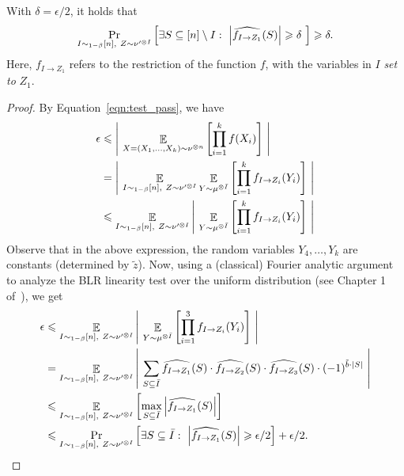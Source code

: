 \begin{lemma}\label{lemma:lfcurr}
	With $\delta = \epsilon/2$, it holds that
	\[ \Pr_{I\sim_{1-\beta}[n],\ Z\sim \nu'^{\otimes I}}\left[ \exists S\subseteq [n]\setminus I:\ \left|\widehat{f_{I\to Z_1}}(S)\right|\geqslant \delta\  \right] \geqslant \delta.\]
	Here, $f_{I\to Z_1}$ refers to the restriction of the function $f$, with the variables in $I$ \emph{set to} $Z_1$.
\end{lemma}	
\begin{proof}
	By Equation~\ref{eqn:test_pass}, we have
	\begin{align*}
		\epsilon &\leqslant \left|\ \mathop{\mathbb{E}}_{X=(X_1,\dots,X_k)\sim \nu^{\otimes n}} \left[ \prod_{i=1}^k f(X_i) \right]\ \right|
		\\&= \left|\ \mathop{\mathbb{E}}_{I\sim_{1-\beta}[n],\ Z\sim \nu'^{\otimes I}}\mathop{\mathbb{E}}_{Y\sim \mu^{\otimes \bar{I}}} \left[ \prod_{i=1}^k f_{I\to Z_i}(Y_i) \right]\ \right|
		\\&\leqslant \mathop{\mathbb{E}}_{I\sim_{1-\beta}[n],\ Z\sim \nu'^{\otimes I}}\left|\ \mathop{\mathbb{E}}_{Y\sim \mu^{\otimes \bar{I}}} \left[ \prod_{i=1}^k f_{I\to Z_i}(Y_i) \right]\ \right|		
	\end{align*}
	Observe that in the above expression, the random variables $Y_4,\dots,Y_k$ are constants (determined by $\tilde{z}$).
	Now, using a (classical) Fourier analytic argument to analyze the BLR linearity test over the uniform distribution (see Chapter 1 of~\cite{Don14}), we get
	\begin{align*}
		\epsilon &\leqslant \mathop{\mathbb{E}}_{I\sim_{1-\beta}[n],\ Z\sim \nu'^{\otimes I}}\left|\ \mathop{\mathbb{E}}_{Y\sim \mu^{\otimes \bar{I}}} \left[ \prod_{i=1}^3 f_{I\to Z_i}(Y_i) \right]\ \right|		
		\\&= \mathop{\mathbb{E}}_{I\sim_{1-\beta}[n],\ Z\sim \nu'^{\otimes I}}\left|\ \sum_{S\subseteq \bar{I}} \widehat{f_{I\to Z_1}}(S)\cdot \widehat{f_{I\to Z_2}}(S)\cdot \widehat{f_{I\to Z_3}}(S)\cdot (-1)^{\tilde{b}\cdot \left|S\right|} \ \right|
		\\&\leqslant \mathop{\mathbb{E}}_{I\sim_{1-\beta}[n],\ Z\sim \nu'^{\otimes I}} \left[ \max_{S\subseteq \bar{I}}\left|\widehat{f_{I\to Z_1}}(S)\right| \right]
		\\&\leqslant \Pr_{I\sim_{1-\beta}[n],\ Z\sim \nu'^{\otimes I}}\left[ \exists S\subseteq \bar{I}:\ \left|\widehat{f_{I\to Z_1}}(S)\right|\geqslant \epsilon/2 \right]  + \epsilon/2.
		\qedhere
	\end{align*}
\end{proof}	


